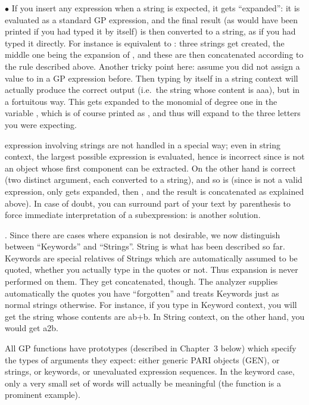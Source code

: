 $\bullet$ If you insert any expression when a string is expected, it gets
``expanded'': it is evaluated as a standard GP expression, and the final
result (as would have been printed if you had typed it by itself) is then
converted to a string, as if you had typed it directly. For instance  is equivalent to : three strings get created, the middle
one being the expansion of , and these are then concatenated
according to the rule described above. Another tricky point here: assume you
did not assign a value to  in a GP expression before. Then typing
 by itself in a string context will actually produce the correct
output (i.e.~the string whose content is aaa), but in a fortuitous way. This
 gets expanded to the monomial of degree one in the variable
, which is of course printed as , and thus will expand to
the three letters you were expecting.

 expression involving strings are not handled in a
special way; even in string context, the largest possible expression is
evaluated, hence  is incorrect since  is not an
object whose first component can be extracted. On the other hand
 is correct (two distinct argument, each converted to a
string), and so is  (since  is not a valid
expression, only  gets expanded, then , and the result is
concatenated as explained above). In case of doubt, you can surround part of
your text by parenthesis to force immediate interpretation of a
subexpression:  is another solution.

. Since there are cases where expansion is not desirable, we
now distinguish between ``Keywords'' and ``Strings''. String is what has been
described so far. Keywords are special relatives of Strings which are
automatically assumed to be quoted, whether you actually type in the quotes
or not. Thus expansion is never performed on them. They get concatenated,
though. The analyzer supplies automatically the quotes you have ``forgotten''
and treats Keywords just as normal strings otherwise. For instance, if you
type  in Keyword context, you will get the string whose contents
are ab+b. In String context, on the other hand, you would get a2\kbd{*}b.

All GP functions have prototypes (described in Chapter~3 below) which
specify the types of arguments they expect: either generic PARI objects
(GEN), or strings, or keywords, or unevaluated expression sequences. In the
keyword case, only a very small set of words will actually be meaningful
(the  function is a prominent example).


